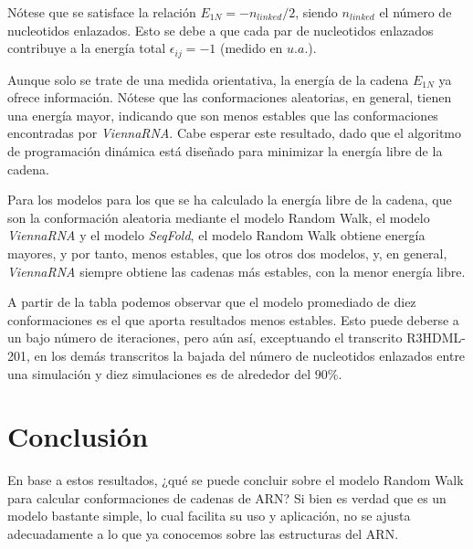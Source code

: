 \documentclass[a4paper,11pt,titlepage]{article}
\theoremstyle{definition}
\begin{document}
Nótese que se satisface la relación $E_{1N} = - n_{linked} / 2$, siendo $n_{linked}$ el número de nucleotidos enlazados. Esto se debe a que cada par de nucleotidos enlazados contribuye a la energía total $\epsilon_{ij} = -1$ (medido en $u.a.$). 

Aunque solo se trate de una medida orientativa, la energía de la cadena $E_{1N}$ ya ofrece información. Nótese que las conformaciones aleatorias, en general, tienen una energía mayor, indicando que son menos estables que las conformaciones encontradas por \textit{ViennaRNA}. Cabe esperar este resultado, dado que el algoritmo de programación dinámica está diseñado para minimizar la energía libre de la cadena.

Para los modelos para los que se ha calculado la energía libre de la cadena, que son la conformación aleatoria mediante el modelo Random Walk, el modelo \textit{ViennaRNA} y el modelo \textit{SeqFold}, el modelo Random Walk obtiene energía mayores, y por tanto, menos estables, que los otros dos modelos, y, en general, \textit{ViennaRNA} siempre obtiene las cadenas más estables, con la menor energía libre.

A partir de la tabla podemos observar que el modelo promediado de diez conformaciones es el que aporta resultados menos estables. Esto puede deberse a un bajo número de iteraciones, pero aún así, exceptuando el transcrito R3HDML-201, en los demás transcritos la bajada del número de nucleotidos enlazados entre una simulación y diez simulaciones es de alrededor del $90\%$. 


\section{Conclusión}\label{sec:cnc}

En base a estos resultados, ¿qué se puede concluir sobre el modelo Random Walk para calcular conformaciones de cadenas de ARN? Si bien es verdad que es un modelo bastante simple, lo cual facilita su uso y aplicación, no se ajusta adecuadamente a lo que ya conocemos sobre las estructuras del ARN.
\end{document}
